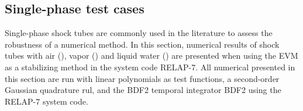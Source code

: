 \documentclass{inputs/mc2015}
\begin{document}
\subsection{Single-phase test cases} \label{sec:1-phase-shock-tube}
%
Single-phase shock tubes are commonly used in the literature to assess the robustness of a numerical method. In this section, numerical results of shock tubes with air (), vapor () and liquid water () are presented when using the EVM as a stabilizing method in the system code RELAP-7. 
All numerical presented in this section are run with linear polynomials as test functions, a second-order Gaussian quadrature rul, and the BDF2 temporal integrator BDF2 using the RELAP-7 system code. %
%
\end{document}
